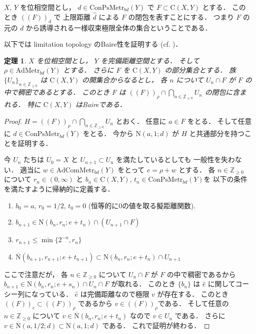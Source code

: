 \documentclass[leqno, a4paper, 12pt]{jsarticle}
\numberwithin{equation}{section}
\newtheorem{thm}{定理}
\newcommand{\zz}{\mathbb{Z}}
\newcommand{\yomapl}[2]{\mathrm{C}(#1, #2)}
\newcommand{\yonbsetq}[3]{\mathrm{N}(#1, #2; #3)}
\newcommand{\yonbsetqc}[3]{\overline{\mathrm{N}}(#1, #2; #3)}
\newcommand{\yosupmet}[1]{\hat{#1}}
\newcommand{\yocbmet}[1]{\mathrm{ConPsMetr}_{bd}(#1)}
\newcommand{\yocbamet}[1]{\mathrm{AdMetr}_{bd}(#1)}
\newcommand{\yocbacmet}[1]{\mathrm{AdComMetr}_{bd}(#1)}
\newcommand{\yometcl}[2]{(\!(#1)\!)_{#2}}
\begin{document}
$X$, 
$Y$
を位相空間とし，
$d\in \yocbmet{Y}$
で
$F\subset \yomapl{X}{Y}$
とする．
このとき
$\yometcl{F}{d}$
で
上限距離
$\yosupmet{d}$
による
$F$
の閉包を表すことにする．
つまり
$F$
の元の
$d$
から誘導される一様収束極限全体の集合ということである．


以下では
limitation topology 
のBaire性を証明する
(cf. \cite{zbMATH03768633})．

\begin{thm}\label{thm:limtopbaire}
$X$
を位相空間とし，
$Y$
を完備距離空間とする．
そして
$\rho\in \yocbamet{Y}$
とする．
さらに
$F$
を
$\yomapl{X}{Y}$
の部分集合とする．
族
$\{U_{n}\}_{n\in \zz_{\ge 0}}$
は
$\yomapl{X}{Y}$
の開集合からなるとし，
各
$n$
について
$U_{n}\cap F$
が
$F$
の中で稠密であるとする．
このとき
$F$
は
$\yometcl{F}{\rho}\cap \bigcap_{n\in \zz_{\ge 0}}U_{n}$
の閉包に含まれる．
特に
$\yomapl{X}{Y}$
はBaireである．
\end{thm}
\begin{proof}
$H=\yometcl{F}{\rho}\cap \bigcap_{n\in \zz_{\ge 0}}U_{n}$
とおく．
任意に
$a\in F$
をとる．
そして任意に
$d\in \yocbmet{Y}$
をとる．
今から
$\yonbsetq{a}{1}{d}$
が
$H$
と共通部分を持つことを証明する．

今
$U_{n}$
たちは
$U_{0}=X$
と
$U_{n+1}\subset U_{n}$
を満たしているとしても
一般性を失わない．
適当に
$w\in \yocbacmet{Y}$
をとって
$e=\rho+w$
とする．
各
$n\in \zz_{\ge 0}$
について
$r_{n}\in (0, \infty)$
と
$b_{n}\in \yomapl{X}{Y}$, 
$t_{n}\in \yocbmet{Y}$を
以下の条件を満たすように帰納的に定義する．
\begin{enumerate}[label=\textup{(\arabic*)}]

\item\label{item:n:0000}
$b_{0}=a$, 
$r_{0}=1/2$, 
$t_{0}=0$
(恒等的に$0$の値を取る擬距離関数). 


\item\label{item:n:1}
$b_{n+1}\in \yonbsetq{b_{n}}{r_{n}}{e+t_{n}}\cap (U_{n+1}\cap F)$



\item\label{item:n:2}
$r_{n+1}\le \min \{2^{-n}, r_{n}\}$


\item\label{item:n:3}
$\yonbsetqc{b_{n+1}}{r_{n+1}}{e+t_{n+1}}\subset \yonbsetq{b_{n}}{r_{n}}{e+t_{n}}\cap U_{n+1}$
\end{enumerate}
ここで注意だが，
各
$n\in \zz_{\ge 0}$
について
$U_{n}\cap F$
が
$F$
の中で稠密であるから
$b_{n+1}\in \yonbsetq{b_{n}}{r_{n}}{e+s_{n}}\cap U_{n}\cap F$
が取れる．
このとき
$\{b_{n}\}$
は
$\yosupmet{e}$
に関してコーシー列になっている．
$\yosupmet{e}$
は完備距離なので極限
$v$
が存在する．
このとき
$\yometcl{F}{e}\subset \yometcl{F}{\rho}$
であるから
$v\in \yometcl{F}{\rho}$である．
そして任意の
$n\in \zz_{\ge 0}$
について
$v\in \yonbsetqc{b_{n}}{r_{n}}{e+t_{n}}$
なので
$v\in U_{n}$
である．
さらに
$v\in \yonbsetqc{a}{1/2}{d}\subset \yonbsetq{a}{1}{d}$
である．
これで証明が終わる．
\end{proof}
\end{document}
